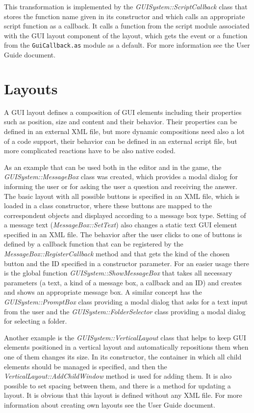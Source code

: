 \documentclass[a4paper, 12pt]{report}
\begin{document}
This transformation is implemented by the \emph{GUISystem::ScriptCallback} class that stores the function name given in its constructor and which calls an appropriate script function as a callback. It calls a function from the script module associated with the GUI layout component of the layout, which gets the event or a function from the \verb/GuiCallback.as/ module as a default. For more information see the User Guide document.

\section{Layouts}
\label{sec:gui-layouts}

A GUI layout defines a composition of GUI elements including their properties such as position, size and content and their behavior. Their properties can be defined in an external XML file, but more dynamic compositions need also a lot of a code support, their behavior can be defined in an external script file, but more complicated reactions have to be also native coded.

As an example that can be used both in the editor and in the game, the \emph{GUISystem::MessageBox} class was created, which provides a modal dialog for informing the user or for asking the user a question and receiving the answer. The basic layout with all possible buttons is specified in an XML file, which is loaded in a class constructor, where these buttons are mapped to the correspondent objects and displayed according to a message box type. Setting of a message text (\emph{MessageBox::SetText}) also changes a static text GUI element specified in an XML file. The behavior after the user clicks to one of buttons is defined by a callback function that can be registered by the \emph{MessageBox::RegisterCallback} method and that gets the kind of the chosen button and the ID specified in a constructor parameter. For an easier usage there is the global function \emph{GUISystem::ShowMessageBox} that takes all necessary parameters (a text, a kind of a message box, a callback and an ID) and creates and shows an appropriate message box. A similar concept has the \emph{GUISystem::PromptBox} class providing a modal dialog that asks for a text input from the user and the \emph{GUISystem::FolderSelector} class providing a modal dialog for selecting a folder.

Another example is the \emph{GUISystem::VerticalLayout} class that helps to keep GUI elements positioned in a vertical layout and automatically repositions them when one of them changes its size. In its constructor, the container in which all child elements should be managed is specified, and then the \emph{VerticalLayout::AddChildWindow} method is used for adding them. It is also possible to set spacing between them, and there is a method for updating a layout. It is obvious that this layout is defined without any XML file. For more information about creating own layouts see the User Guide document.
\end{document}
